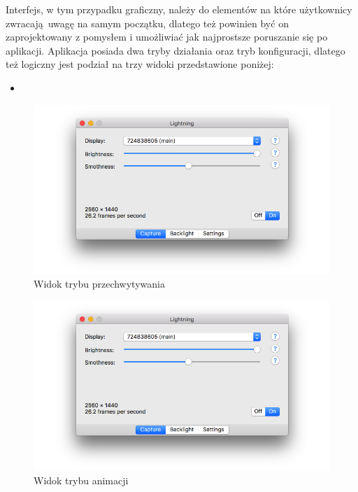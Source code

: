 \documentclass[12pt]{report}
\begin{document}
Interfejs, w tym przypadku graficzny, należy do elementów na które użytkownicy zwracają uwagę na samym początku, dlatego też powinien być on zaprojektowany z pomysłem i umożliwiać jak najprostsze poruszanie się po aplikacji.
Aplikacja posiada dwa tryby działania oraz tryb konfiguracji, dlatego też logiczny jest podział na trzy widoki przedstawione poniżej:


\begin{itemize}
	\item 
\end{itemize}

\begin{figure}[h]
\centering
\includegraphics[width=\textwidth]{../resources/capture.png}
\caption{Widok trybu przechwytywania}
\end{figure}

\begin{figure}[h]
\centering
\includegraphics[width=\textwidth]{../resources/capture.png}
\caption{Widok trybu animacji}
\end{figure}
\end{document}
